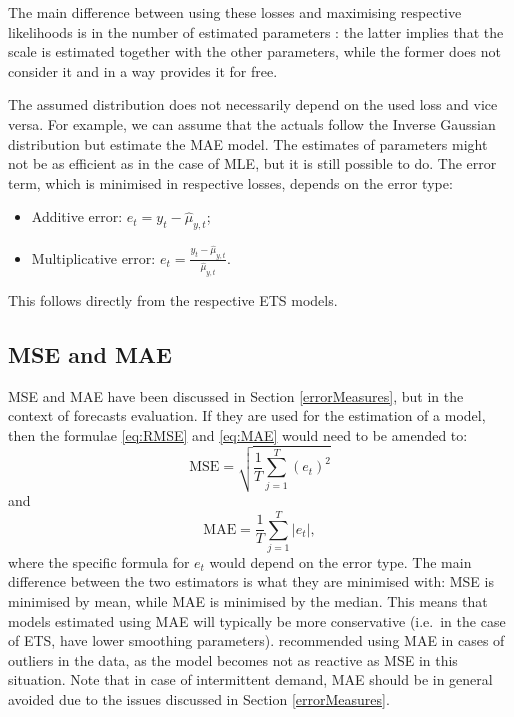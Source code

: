 \documentclass[]{book}
\providecommand{\tightlist}{%
  \setlength{\itemsep}{0pt}\setlength{\parskip}{0pt}}
\theoremstyle{definition}
\theoremstyle{definition}
\theoremstyle{definition}
\theoremstyle{definition}
\theoremstyle{remark}
\begin{document}
The main difference between using these losses and maximising respective likelihoods is in the number of estimated parameters \citep[see discussion in Section 13.3 of][]{SvetunkovSBA}: the latter implies that the scale is estimated together with the other parameters, while the former does not consider it and in a way provides it for free.

The assumed distribution does not necessarily depend on the used loss and vice versa. For example, we can assume that the actuals follow the Inverse Gaussian distribution but estimate the MAE model. The estimates of parameters might not be as efficient as in the case of MLE, but it is still possible to do. The error term, which is minimised in respective losses, depends on the error type:

\begin{itemize}
\tightlist
\item
  Additive error: \(e_t = y_t -\hat{\mu}_{y,t}\);
\item
  Multiplicative error: \(e_t = \frac{y_t -\hat{\mu}_{y,t}}{\hat{\mu}_{y,t}}\).
\end{itemize}

This follows directly from the respective ETS models.

\hypertarget{MSEandMAEEstimators}{%
\subsection{MSE and MAE}\label{MSEandMAEEstimators}}

MSE and MAE have been discussed in Section \ref{errorMeasures}, but in the context of forecasts evaluation. If they are used for the estimation of a model, then the formulae \eqref{eq:RMSE} and \eqref{eq:MAE} would need to be amended to:
\begin{equation}
    \mathrm{MSE} = \sqrt{\frac{1}{T} \sum_{j=1}^T \left( e_t \right)^2 }
    \label{eq:MSEInSample}
\end{equation}
and
\begin{equation}
    \mathrm{MAE} = \frac{1}{T} \sum_{j=1}^T \left| e_t \right| ,
    \label{eq:MAEInSample}
\end{equation}
where the specific formula for \(e_t\) would depend on the error type. The main difference between the two estimators is what they are minimised with: MSE is minimised by mean, while MAE is minimised by the median. This means that models estimated using MAE will typically be more conservative (i.e.~in the case of ETS, have lower smoothing parameters). \citet{Gardner2006} recommended using MAE in cases of outliers in the data, as the model becomes not as reactive as MSE in this situation. Note that in case of intermittent demand, MAE should be in general avoided due to the issues discussed in Section \ref{errorMeasures}.
\end{document}
